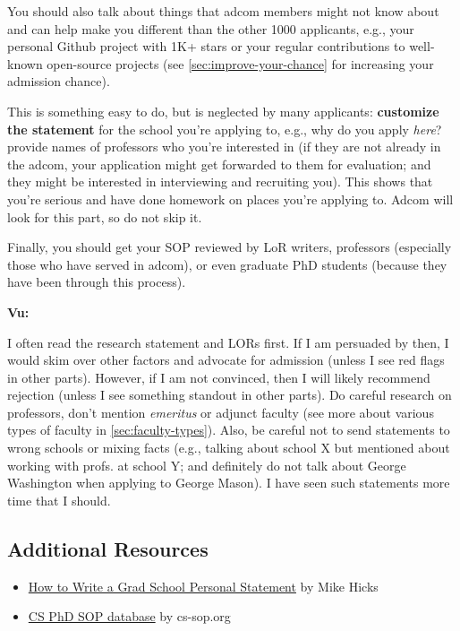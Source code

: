 \documentclass[oneside,11pt]{memoir}
\newenvironment{commentbox}[1][]{
  \small
  \begin{mybox}
    {\small \textbf{#1}}
  }{
  \end{mybox}
}
\begin{document}
You should also talk about things that adcom members might not know about and can help make you different than the other 1000 applicants, e.g.,  your personal Github project with 1K+ stars or your regular contributions to well-known open-source projects (see \autoref{sec:improve-your-chance} for increasing your admission chance).


This is something easy to do, but is neglected by many
applicants: \textbf{customize the statement} for the school you're applying to,
e.g., why do you apply \emph{here}? provide names of professors who you're interested in (if they are not already in the adcom, your application might get forwarded to them for evaluation; and they might be interested in interviewing and recruiting you).
This shows that you're serious and have done homework on places you're applying to.
Adcom will look for this part, so do not skip it.

Finally, you should get your SOP reviewed by LoR writers, professors (especially those who have served in adcom), or even graduate PhD students (because they have been through this process).  

\begin{commentbox}[Vu:]
  I often read the research statement and LORs first. If I am
  persuaded by then, I would skim over other factors and advocate for
  admission (unless I see red flags in other parts). However, if I am not
  convinced, then I will likely recommend rejection (unless I see
  something standout in other parts).
  \tcblower
  Do careful research on professors, don't mention \emph{emeritus} or  adjunct faculty (see more about various types of faculty in \autoref{sec:faculty-types}).
  Also, be careful not to send statements to wrong schools or mixing
  facts (e.g., talking about school X but mentioned about working with
  profs. at school Y; and definitely do not talk about George Washington when applying to George Mason). I have seen such statements more time that I
  should.
\end{commentbox}




\subsection*{Additional Resources}
\begin{itemize}
  \item \href{http://www.pl-enthusiast.net/2022/10/03/how-to-write-a-grad-school-personal-statement/}{How to Write a Grad School Personal Statement} by Mike Hicks
  \item     \href{https://cs-sop.notion.site/cs-sop/CS-PhD-Statements-of-Purpose-df39955313834889b7ac5411c37b958d?p=f5d5980a71524ebaa4e6ae57266b847c&pm=s}{CS PhD SOP database} by cs-sop.org
\end{itemize}
\end{document}
